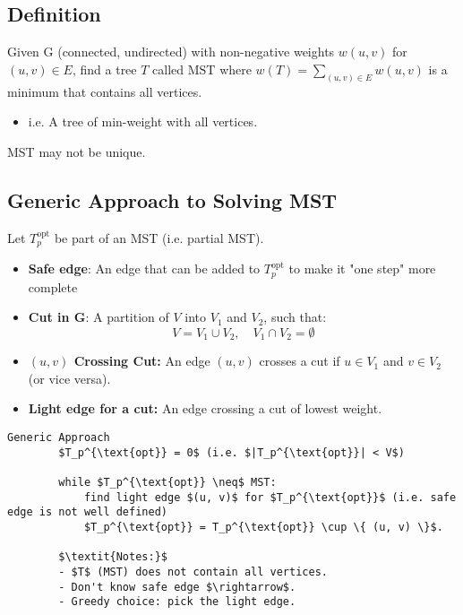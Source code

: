 \subsection{Definition}
\begin{definition}
    Given G (connected, undirected) with non-negative weights $w(u,v)$ for $(u,v) \in E$, find a tree $T$ called $\text{MST}$ where $w(T) = \sum_{(u,v) \in E} w(u,v)$ is a minimum that contains all vertices. 
    \begin{itemize}
        \item i.e. A tree of min-weight with all vertices.
    \end{itemize}
\end{definition}

\begin{warning}
    MST may not be unique.
\end{warning}

\subsection{Generic Approach to Solving MST}
\begin{intuition}
    Let \( T_p^{\text{opt}} \) be part of an MST (i.e. partial MST).
    \begin{itemize}
        \item \textbf{Safe edge}: An edge that can be added to \( T_p^{\text{opt}} \) to make it "one step" more complete

        \item \textbf{Cut in G}: A partition of \( V \) into \( V_1 \) and \( V_2 \), such that:
        \[
        V = V_1 \cup V_2, \quad V_1 \cap V_2 = \emptyset
        \]
        \item \textbf{$(u,v)$ Crossing Cut:} An edge \( (u, v) \) crosses a cut if \( u \in V_1 \) and \( v \in V_2 \) (or vice versa).
        \item \textbf{Light edge for a cut:} An edge crossing a cut of lowest weight.
    \end{itemize}

    \begin{lstlisting}[mathescape]
        Generic Approach 
        $T_p^{\text{opt}} = 0$ (i.e. $|T_p^{\text{opt}}| < V$)
        
        while $T_p^{\text{opt}} \neq$ MST:
            find light edge $(u, v)$ for $T_p^{\text{opt}}$ (i.e. safe edge is not well defined)
            $T_p^{\text{opt}} = T_p^{\text{opt}} \cup \{ (u, v) \}$.
        
        $\textit{Notes:}$
        - $T$ (MST) does not contain all vertices.
        - Don't know safe edge $\rightarrow$. 
        - Greedy choice: pick the light edge.
        \end{lstlisting}        
\end{intuition}

